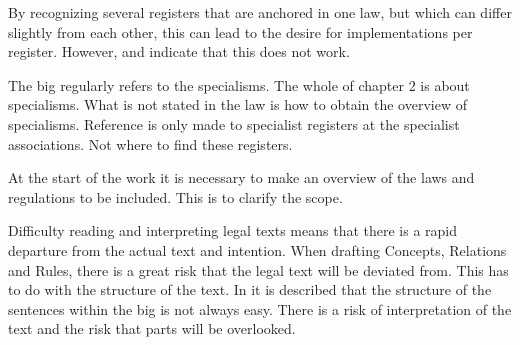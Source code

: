 By recognizing several registers that are anchored in one law, but which can differ slightly from each other, this can lead to the desire for implementations per register.
However,  and  indicate that this does not work.

The \acrshort{big} regularly refers to the specialisms.
The whole of chapter 2 is about specialisms.
What is not stated in the law is how to obtain the overview of specialisms.
Reference is only made to specialist registers at the specialist associations.
Not where to find these registers.

At the start of the work it is necessary to make an overview of the laws and regulations to be included.
This is to clarify the scope.

Difficulty reading and interpreting legal texts means that there is a rapid departure from the actual text and intention.
When drafting Concepts, Relations and Rules, there is a great risk that the legal text will be deviated from.
This has to do with the structure of the text.
In  it is described that the structure of the sentences within the \acrshort{big} is not always easy.
There is a risk of interpretation of the text and the risk that parts will be overlooked.


